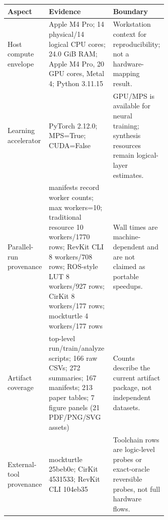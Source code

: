 \begin{tabularx}{\linewidth}{>{\raggedright\arraybackslash}p{0.18\linewidth}>{\raggedright\arraybackslash}p{0.45\linewidth}>{\raggedright\arraybackslash}X}
\toprule
Aspect & Evidence & Boundary \\
\midrule
Host compute envelope & Apple M4 Pro; 14 physical/14 logical CPU cores; 24.0 GiB RAM; Apple M4 Pro, 20 GPU cores, Metal 4; Python 3.11.15 & Workstation context for reproducibility; not a hardware-mapping result. \\
Learning accelerator & PyTorch 2.12.0; MPS=True; CUDA=False & GPU/MPS is available for neural training; synthesis resources remain logical-layer estimates. \\
Parallel-run provenance & 59 manifests record worker counts; max workers=10; traditional resource 10 workers/1770 rows; RevKit CLI 8 workers/708 rows; ROS-style LUT 8 workers/927 rows; CirKit 8 workers/177 rows; mockturtle 4 workers/177 rows & Wall times are machine-dependent and are not claimed as portable speedups. \\
Artifact coverage & 147 top-level run/train/analyze scripts; 166 raw CSVs; 272 summaries; 167 manifests; 213 paper tables; 7 figure panels (21 PDF/PNG/SVG assets) & Counts describe the current artifact package, not independent datasets. \\
External-tool provenance & mockturtle 25beb0e; CirKit 4531533; RevKit CLI 104eb35 & Toolchain rows are logic-level probes or exact-oracle reversible probes, not full hardware flows. \\
\bottomrule
\end{tabularx}
